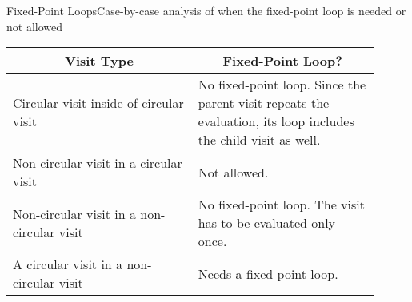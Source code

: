 \begin{frame}{Fixed-Point Loops}{Case-by-case analysis of when the fixed-point loop is needed or not allowed}

{ \small
\begin{tabular}{|p{0.46\linewidth} | p{0.45\linewidth}|}
\hline
\multicolumn{1}{|c|}{Visit Type} & \multicolumn{1}{c|}{Fixed-Point Loop?}   \\ 
\hline\hline
Circular visit inside of circular visit & No fixed-point loop. Since the parent visit repeats the evaluation, its loop includes the child visit as well.\\ \hline
Non-circular visit in a circular visit & Not allowed. \\ \hline
Non-circular visit in a non-circular visit & No fixed-point loop. The visit has to be evaluated only once. \\ \hline
A circular visit in a non-circular visit & Needs a fixed-point loop. \\ \hline
\end{tabular} }

\end{frame}

